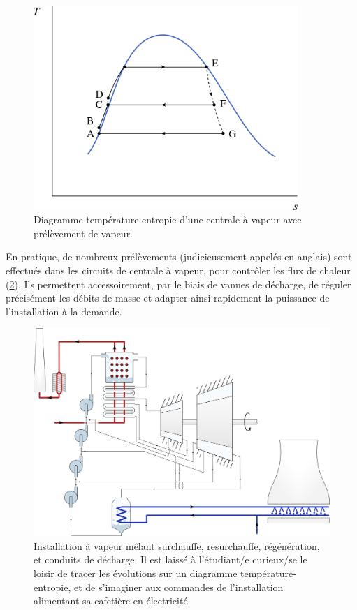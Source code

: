 		\begin{figure}
			\begin{center}
				\includegraphics[width=10cm]{images/ts_lv_prelevement.png}
			\end{center}
			\caption{Diagramme température-entropie d’une centrale à vapeur avec prélèvement de vapeur.}
			\label{fig_ts_lv_prelevement_vapeur}
		\end{figure}

		En pratique, de nombreux prélèvements (judicieusement appelés  en anglais) sont effectués dans les circuits de centrale à vapeur, pour contrôler les flux de chaleur (\cref{fig_grosse_centrale_vapeur}). Ils permettent accessoirement, par le biais de vannes de décharge, de réguler précisément les débits de masse et adapter ainsi rapidement la puissance de l’installation à la demande.

		\begin{landscape}
		\begin{figure}
		 	\begin{center}
		 			\vspace{-1cm}
				\centerline{\includegraphics[width=20cm]{images/circuit_complet.png}}
			\end{center}
			\caption{Installation à vapeur mêlant surchauffe, resurchauffe, régénération, et conduits de décharge.
		Il est laissé à l’étudiant/e curieux/se le loisir de tracer les évolutions sur un diagramme température-entropie, et de s’imaginer aux commandes de l’installation alimentant sa cafetière en électricité.}
			\label{fig_grosse_centrale_vapeur}
		\end{figure}
		\end{landscape}
